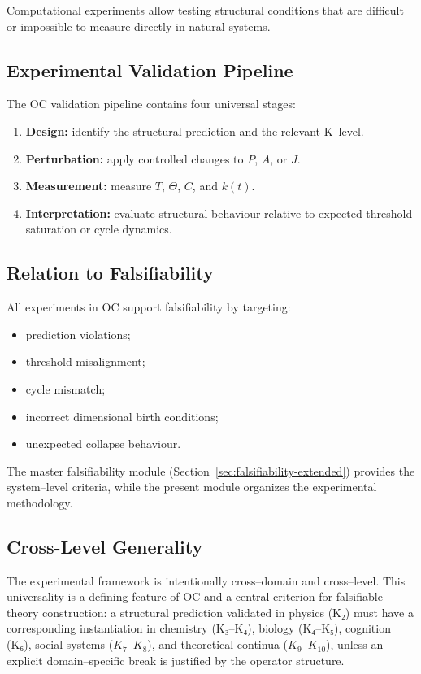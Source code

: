 Computational experiments allow testing structural conditions that are
difficult or impossible to measure directly in natural systems.


\subsection{Experimental Validation Pipeline}

The OC validation pipeline contains four universal stages:

\begin{enumerate}
    \item \textbf{Design:} identify the structural prediction and the relevant
          K–level.
    \item \textbf{Perturbation:} apply controlled changes to $P$, $A$, or $J$.
    \item \textbf{Measurement:} measure $T$, $\Theta$, $C$, and $k(t)$.
    \item \textbf{Interpretation:} evaluate structural behaviour relative to
          expected threshold saturation or cycle dynamics.
\end{enumerate}


\subsection{Relation to Falsifiability}

All experiments in OC support falsifiability by targeting:

\begin{itemize}
    \item prediction violations;
    \item threshold misalignment;
    \item cycle mismatch;
    \item incorrect dimensional birth conditions;
    \item unexpected collapse behaviour.
\end{itemize}

The master falsifiability module (Section~\ref{sec:falsifiability-extended})
provides the system–level criteria, while the present module organizes the
experimental methodology.


\subsection{Cross-Level Generality}

The experimental framework is intentionally cross–domain and cross–level.
This universality is a defining feature of OC and a central criterion for
falsifiable theory construction:  
a structural prediction validated in physics (K₂) must have a corresponding
instantiation in chemistry (K₃–K₄), biology (K₄–K₅), cognition (K₆), social
systems ($K_7$–$K_8$), and theoretical continua ($K_9$–$K_{10}$), unless an explicit
domain–specific break is justified by the operator structure.


